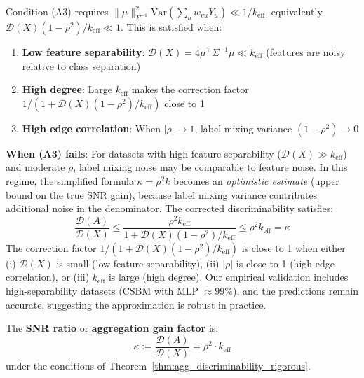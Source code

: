 \begin{remark}
\label{rem:a3_condition}
Condition (A3) requires $\|\mu\|_{\Sigma^{-1}}^2 \mathrm{Var}(\sum_u w_{vu} Y_u) \ll 1 / k_{\mathrm{eff}}$, equivalently $\mathcal{D}(X) (1-\rho^2) / k_{\mathrm{eff}} \ll 1$. This is satisfied when:
\begin{enumerate}
    \item \textbf{Low feature separability}: $\mathcal{D}(X) = 4\mu^\top \Sigma^{-1} \mu \ll k_{\mathrm{eff}}$ (features are noisy relative to class separation)
    \item \textbf{High degree}: Large $k_{\mathrm{eff}}$ makes the correction factor $1/(1 + \mathcal{D}(X)(1-\rho^2)/k_{\mathrm{eff}})$ close to 1
    \item \textbf{High edge correlation}: When $|\rho| \to 1$, label mixing variance $(1-\rho^2) \to 0$
\end{enumerate}

\textbf{When (A3) fails}: For datasets with high feature separability ($\mathcal{D}(X) \gg k_{\mathrm{eff}}$) and moderate $\rho$, label mixing noise may be comparable to feature noise. In this regime, the simplified formula $\kappa = \rho^2 k$ becomes an \textit{optimistic estimate} (upper bound on the true SNR gain), because label mixing variance contributes additional noise in the denominator. The corrected discriminability satisfies:
\begin{equation}
    \frac{\mathcal{D}(A)}{\mathcal{D}(X)} \leq \frac{\rho^2 k_{\mathrm{eff}}}{1 + \mathcal{D}(X)(1-\rho^2)/k_{\mathrm{eff}}} \leq \rho^2 k_{\mathrm{eff}} = \kappa
\end{equation}
The correction factor $1/(1 + \mathcal{D}(X)(1-\rho^2)/k_{\mathrm{eff}})$ is close to 1 when either (i) $\mathcal{D}(X)$ is small (low feature separability), (ii) $|\rho|$ is close to 1 (high edge correlation), or (iii) $k_{\mathrm{eff}}$ is large (high degree). Our empirical validation includes high-separability datasets (CSBM with MLP $\approx 99\%$), and the predictions remain accurate, suggesting the approximation is robust in practice.
\end{remark}

\begin{definition}
\label{def:snr_ratio}
The \textbf{SNR ratio} or \textbf{aggregation gain factor} is:
\begin{equation}
    \kappa := \frac{\mathcal{D}(A)}{\mathcal{D}(X)} = \rho^2 \cdot k_{\mathrm{eff}}
\end{equation}
under the conditions of Theorem~\ref{thm:agg_discriminability_rigorous}.
\end{definition}


